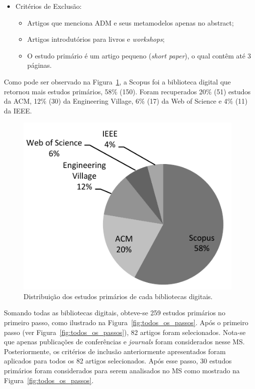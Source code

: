 \begin{itemize}
\item Critérios de Exclusão:
    \begin{itemize}
    \item Artigos que menciona ADM e seus metamodelos apenas no abstract;
    \item Artigos introdutórios para livros e \textit{workshops};
    \item O estudo primário é um artigo pequeno (\textit{short paper}), o qual contêm até 3 páginas.
    \end{itemize}
\end{itemize}


Como pode ser observado na Figura~\ref{fig:distribuicao_biblioteca_digital}, a Scopus foi a biblioteca digital que retornou mais estudos primários, 58\% (150). Foram recuperados 20\% (51) estudos da ACM, 12\% (30) da Engineering Village, 6\% (17) da Web of Science e 4\% (11) da IEEE. 

\begin{figure}[h]
 \caption{Distribuição dos estudos primários de cada bibliotecas digitais.}
 \label{fig:distribuicao_biblioteca_digital}
 \centering
 \includegraphics[scale=0.9]{images/retornoDasBasesMS}
 \fautor
\end{figure}

Somando todas as bibliotecas digitais, obteve-se 259 estudos primários no primeiro passo, como ilustrado na Figura~\ref{fig:todos_os_passos}. Após o primeiro passo (ver Figura~\ref{fig:todos_os_passos}), 82 artigos foram selecionados. Nota-se que apenas publicações de conferências e \textit{journals} foram considerados nesse MS. Posteriormente, os critérios de inclusão anteriormente apresentados foram aplicados para todos os 82 artigos selecionados. Após esse passo, 30 estudos primários foram considerados para serem analisados no MS como mostrado na Figura~\ref{fig:todos_os_passos}.

